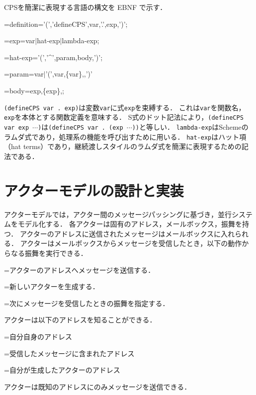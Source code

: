 \documentclass[10pt,a4j,twocolumn,oneside]{jsarticle}
\newenvironment{hang}[1][\parindent]
  {\def\item{\par\hangindent=#1\noindent}}
  {\par}
\def\,{,\allowbreak}
\def\|{$|$\allowbreak}
\def\hat{\mbox{\^{ }}}
\def\c...{\mbox{$\cdots\mbox{}$}}
\begin{document}
CPSを簡潔に表現する言語の構文を EBNF で示す．%
\begin{hang}\tt %
\item definition='('\,'defineCPS'\,var\,'.'\,exp\,')';
\item exp=var\|hat-exp\|lambda-exp;
\item hat-exp='('\,'\hat'\,param\,body\,')';
\item param=var\|'('\,var\,\{var\}\,['.'\,var]\,')'
\item body=exp\,\{exp\}\,['.'\,exp];
\end{hang}
{\tt (defineCPS var . exp)}は変数{\tt var}に式{\tt exp}を束縛する．
これは{\tt var}を関数名，{\tt exp}を本体とする関数定義を意味する．
S式のドット記法により，{\tt (defineCPS var exp \c...)}は{\tt (defineCPS var . (exp \c...))}と等しい．
{\tt lambda-exp}はSchemeのラムダ式であり，処理系の機能を呼び出すために用いる．
{\tt hat-exp}はハット項（hat terms）であり，継続渡しスタイルのラムダ式を簡潔に表現するための記法である．

\section{アクターモデルの設計と実装}

アクターモデルでは，アクター間のメッセージパッシングに基づき，並行システムをモデル化する．
各アクターは固有のアドレス，メールボックス，振舞を持つ．
アクターのアドレスに送信されたメッセージはメールボックスに入れられる．
アクターはメールボックスからメッセージを受信したとき，以下の動作からなる振舞を実行できる．
\begin{itemize}
	\setlength{\itemsep}{0pt}      %
	\setlength{\parskip}{0pt}      %
	\setlength{\itemindent}{0pt}   %
	\setlength{\labelsep}{5pt}     %
\item アクターのアドレスへメッセージを送信する．
\item 新しいアクターを生成する．
\item 次にメッセージを受信したときの振舞を指定する．
\end{itemize}
アクターは以下のアドレスを知ることができる．
\begin{itemize}
	\setlength{\itemsep}{0pt}      %
	\setlength{\parskip}{0pt}      %
	\setlength{\itemindent}{0pt}   %
	\setlength{\labelsep}{5pt}     %
\item 自分自身のアドレス
\item 受信したメッセージに含まれたアドレス
\item 自分が生成したアクターのアドレス
\end{itemize}
アクターは既知のアドレスにのみメッセージを送信できる．
\end{document}
